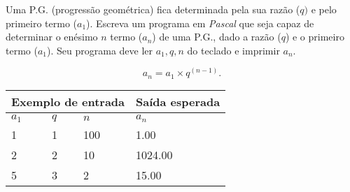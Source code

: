 \item Uma P.G. (progressão geométrica) fica determinada pela sua razão ($q)$ 
e pelo primeiro termo ($a_1$). Escreva um programa em \emph{Pascal} que seja 
capaz de determinar o enésimo $n$ termo ($a_n$) de uma P.G., dado a razão ($q$) 
e o primeiro termo ($a_1$). Seu programa deve ler $a_1, q, n$ do teclado
e imprimir $a_n$.

\[
a_n = a_1 \times q^{(n-1)}.
\]

\begin{center}
\begin{tabular}{|l|l|l|l|} \hline
\multicolumn{3}{|c|}{Exemplo de entrada} & Saída esperada \\ \hline
$a_1$ & $q$ & $n$   & $a_n$               \\ \hline
1 & 1 & 100         & 1.00                \\ \hline
2 & 2 & 10          & 1024.00             \\ \hline
5 & 3 & 2           & 15.00               \\ \hline
\end{tabular}
\end{center}